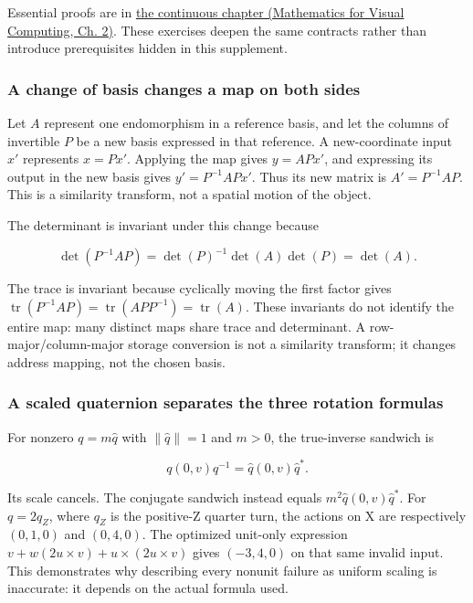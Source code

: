 Essential proofs are in \href{../02-Mathematics-for-Visual-Computing/main.pdf\#nameddest=01-foundations-i-ch018-keep-the-promises-visible-while-moving-between-representations}{the continuous chapter (Mathematics for Visual Computing, Ch. 2)}. These exercises deepen the same contracts rather than introduce prerequisites hidden in this supplement.

\subsubsection{A change of basis changes a map on both sides}\label{02-foundations-ii-ch039-a-change-of-basis-changes-a-map-on-both-sides}

Let \(A\) represent one endomorphism in a reference basis, and let the columns of invertible \(P\) be a new basis expressed in that reference. A new-coordinate input \(x'\) represents \(x=Px'\). Applying the map gives \(y=APx'\), and expressing its output in the new basis gives \(y'=P^{-1}APx'\). Thus its new matrix is \(A'=P^{-1}AP\). This is a similarity transform, not a spatial motion of the object.

The determinant is invariant under this change because

\[
\det(P^{-1}AP)=\det(P)^{-1}\det(A)\det(P)=\det(A).
\]

The trace is invariant because cyclically moving the first factor gives \(\operatorname{tr}(P^{-1}AP)=\operatorname{tr}(APP^{-1})=\operatorname{tr}(A)\). These invariants do not identify the entire map: many distinct maps share trace and determinant. A row-major/column-major storage conversion is not a similarity transform; it changes address mapping, not the chosen basis.

\subsubsection{A scaled quaternion separates the three rotation formulas}\label{02-foundations-ii-ch039-a-scaled-quaternion-separates-the-three-rotation-formulas}

For nonzero \(q=m\widehat q\) with \(\|\widehat q\|=1\) and \(m>0\), the true-inverse sandwich is

\[
q(0,v)q^{-1}=\widehat q(0,v)\widehat q^*.
\]

Its scale cancels. The conjugate sandwich instead equals \(m^2\widehat q(0,v)\widehat q^*\). For \(q=2q_Z\), where \(q_Z\) is the positive-Z quarter turn, the actions on X are respectively \((0,1,0)\) and \((0,4,0)\). The optimized unit-only expression \(v+w(2u\times v)+u\times(2u\times v)\) gives \((-3,4,0)\) on that same invalid input. This demonstrates why describing every nonunit failure as uniform scaling is inaccurate: it depends on the actual formula used.

